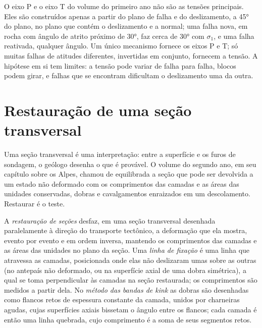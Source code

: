 O eixo P e o eixo T do volume do primeiro ano não são as tensões principais. Eles são
construídos apenas a partir do plano de falha e do deslizamento, a \ang{45} do plano, no
plano que contém o deslizamento e a normal; uma falha nova, em rocha com ângulo de
atrito próximo de \ang{30}, faz cerca de \ang{30} com $\sigma_1$, e uma
falha reativada, qualquer ângulo. Um único mecanismo fornece os eixos P e T; só muitas
falhas de atitudes diferentes, invertidas em conjunto, fornecem a tensão. A
hipótese em si tem limites: a tensão pode variar de falha para falha, blocos
podem girar, e falhas que se encontram dificultam o deslizamento uma da outra.

\section{Restauração de uma seção transversal}\label{sec:b3:structural-analysis:restoration}

Uma seção transversal é uma interpretação: entre a superfície e os furos de sondagem,
o geólogo desenha o que é provável. O volume do segundo ano, em seu capítulo sobre os
Alpes, chamou de equilibrada a seção que pode ser devolvida a um estado não deformado
com os comprimentos das camadas e as áreas das unidades conservadas, dobras e
cavalgamentos enraizados em um descolamento. Restaurar é o teste.

\begin{definition}\label{def:b3:structural-analysis:restoration}
A \emph{restauração de seções} desfaz, em uma seção
transversal desenhada paralelamente à direção do transporte tectônico, a
deformação que ela mostra, evento por evento e em ordem inversa, mantendo os
comprimentos das camadas e as áreas das unidades no plano da seção.
Uma \emph{linha de fixação} é uma linha que atravessa as camadas, posicionada onde elas
não deslizaram umas sobre as outras (no antepaís não deformado, ou na superfície axial
de uma dobra simétrica), a qual se toma perpendicular às camadas
na seção restaurada; os comprimentos são medidos a partir dela. No
\emph{método das bandas de kink} as dobras são desenhadas como flancos retos
de espessura constante da camada, unidos por charneiras agudas, cujas superfícies axiais
bissetam o ângulo entre os flancos; cada camada é então uma linha quebrada, cujo
comprimento é a soma de seus segmentos retos.
\end{definition}

